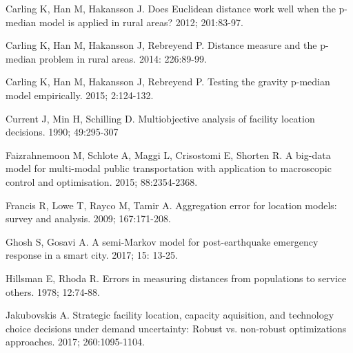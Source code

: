 \documentclass[twoside,twocolumn]{article}
\begin{document}
\begin{thebibliography}{99}
Carling K, Han M, Hakansson J.
\newblock Does Euclidean distance work well when the p-median model is applied in rural areas?
 2012; 201:83-97.

Carling K, Han M, Hakansson J, Rebreyend P.
\newblock Distance measure and the p-median problem in rural areas.
 2014: 226:89-99.

Carling K, Han M, Hakansson J, Rebreyend P.
\newblock Testing the gravity p-median model empirically.
 2015; 2:124-132.

Current J, Min H, Schilling D.
\newblock Multiobjective analysis of facility location decisions.
 1990; 49:295-307

Faizrahnemoon M, Schlote A, Maggi L, Crisostomi E, Shorten R.
\newblock A big-data model for multi-modal public transportation with application to macroscopic control and optimisation.
 2015; 88:2354-2368.

Francis R, Lowe T, Rayco M, Tamir A.
\newblock Aggregation error for location models: survey and analysis.
 2009; 167:171-208.

Ghosh S, Gosavi A.
\newblock A semi-Markov model for post-earthquake emergency response in a smart city.
 2017; 15: 13-25.

Hillsman E, Rhoda R.
\newblock Errors in measuring distances from populations to service others.
 1978; 12:74-88.

Jakubovskis A.
\newblock Strategic facility location, capacity aquisition, and technology choice decisions under demand uncertainty: Robust vs. non-robust optimizations approaches.
 2017; 260:1095-1104.


\end{thebibliography}
\end{document}
